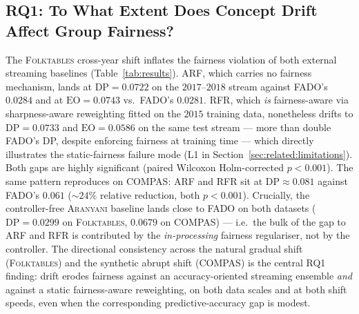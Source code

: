 \documentclass[sigconf,anonymous,review]{acmart}
\begin{document}
\subsection{RQ1: To What Extent Does Concept Drift Affect Group Fairness?}
\label{sec:results:rq1}
The \textsc{Folktables} cross-year shift inflates the fairness violation of both external streaming baselines (Table~\ref{tab:results}). \textsc{ARF},
which carries no fairness mechanism, lands at $\mathrm{DP}=0.0722$ on the $2017$--$2018$ stream against \textsc{FADO}'s $0.0284$ and at $\mathrm{EO}=0.0743$
vs.\ \textsc{FADO}'s $0.0281$. \textsc{RFR}, which \emph{is} fairness-aware via sharpness-aware reweighting fitted on the $2015$ training data,
nonetheless drifts to $\mathrm{DP}=0.0733$ and $\mathrm{EO}=0.0586$ on the same test stream --- more than double \textsc{FADO}'s DP, despite enforcing
fairness at training time --- which directly illustrates the static-fairness failure mode (L1 in Section~\ref{sec:related:limitations}). Both gaps are
highly significant (paired Wilcoxon Holm-corrected $p<0.001$). The same pattern reproduces on \textsc{COMPAS}: \textsc{ARF} and \textsc{RFR} sit at
$\mathrm{DP}\approx 0.081$ against \textsc{FADO}'s $0.061$ ($\sim 24\%$ relative reduction, both $p<0.001$). Crucially, the controller-free
\textsc{Aranyani} baseline lands close to \textsc{FADO} on both datasets ($\mathrm{DP}=0.0299$ on \textsc{Folktables}, $0.0679$ on \textsc{COMPAS}) ---
i.e.\ the bulk of the gap to \textsc{ARF} and \textsc{RFR} is contributed by the \emph{in-processing} fairness regulariser, not by the controller. The
directional consistency across the natural gradual shift (\textsc{Folktables}) and the synthetic abrupt shift (\textsc{COMPAS}) is the central RQ1 finding:
drift erodes fairness against an accuracy-oriented streaming ensemble \emph{and} against a static fairness-aware reweighting, on both data scales and at
both shift speeds, even when the corresponding predictive-accuracy gap is modest.
\end{document}
